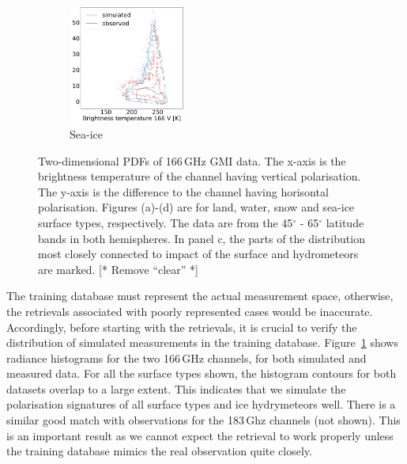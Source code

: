 \documentclass[12pt,oneside,a4paper]{article}
\newcommand\intodo[1]{{\color{red} [* #1 *]}}
\begin{document}
\begin{figure}[t]
\begin{subfigure}{.24\textwidth}
	\caption{ Sea-ice}
	\includegraphics[height = 39mm, width = 39mm]{Figures/hist2d_gmi_highlat_sea-ice.pdf}
\end{subfigure}
\caption{Two-dimensional PDFs of 166\,GHz GMI data. The x-axis is the
  brightness temperature of the channel having vertical polarisation. The
  y-axis is the difference to the channel having horisontal polarisation. Figures
  (a)-(d) are for land, water, snow and sea-ice surface types, respectively.
  The data are from the 45$^\circ$ - 65$^\circ$ latitude bands in both
  hemispheres. In panel c, the parts of the distribution most closely connected
  to impact of the surface and hydrometeors are marked.\intodo{Remove ``clear''}}
  \label{fig:histogram_2d}
\end{figure}

The training database must represent the actual measurement space, otherwise,
the retrievals associated with poorly represented cases would be inaccurate.
Accordingly, before starting with the retrievals, it is crucial to verify the
distribution of simulated measurements in the training database.
Figure~\ref{fig:histogram_2d} shows radiance histograms for the two 166\,GHz
channels, for both simulated and measured data. For all the surface types
shown, the histogram contours for both datasets overlap to a large extent. This
indicates that we simulate the polarisation signatures of all surface types and
ice hydrymeteors well. There is a similar good match with observations for the
183\,Ghz channels (not shown). This is an important result as we cannot expect
the retrieval to work properly unless the training database mimics the real
observation quite closely.
\end{document}
